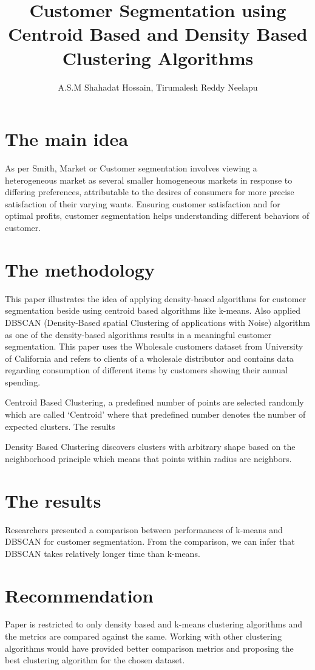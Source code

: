 \documentclass[a4paper]{article}
\title{Customer Segmentation using Centroid Based and Density Based Clustering Algorithms}
\author[1]{A.S.M Shahadat Hossain, Tirumalesh Reddy Neelapu}
\begin{document}
\maketitle
\section{The main idea}

As per Smith, Market or Customer segmentation involves viewing a heterogeneous market as several smaller homogeneous markets in response to differing preferences, attributable to the desires of consumers for more precise satisfaction of their varying wants. Ensuring customer satisfaction and for optimal profits, customer segmentation helps understanding different behaviors of customer. 

\section{The methodology }

This paper illustrates the idea of applying density-based algorithms for customer segmentation beside using centroid based algorithms like k-means. Also applied DBSCAN (Density-Based spatial Clustering of applications with Noise) algorithm as one of the density-based algorithms results in a meaningful customer segmentation. This paper uses the Wholesale customers dataset from University of California and refers to clients of a wholesale distributor and contains data regarding consumption of different items by customers showing their annual spending.

Centroid Based Clustering, a predefined number of points are selected randomly which are called ‘Centroid’ where that predefined number denotes the number of expected clusters.
The results

Density Based Clustering discovers clusters with arbitrary shape based on the neighborhood principle which means that points within radius are neighbors.


\section{The results}
 
Researchers presented a comparison between performances of k-means and DBSCAN for customer segmentation. From the comparison, we can infer that DBSCAN takes relatively longer time than k-means. 

\section{Recommendation}

Paper is restricted to only density based and k-means clustering algorithms and the metrics are compared against the same. Working with other clustering algorithms would have provided better comparison metrics and proposing the best clustering algorithm for the chosen dataset.
\end{document}
